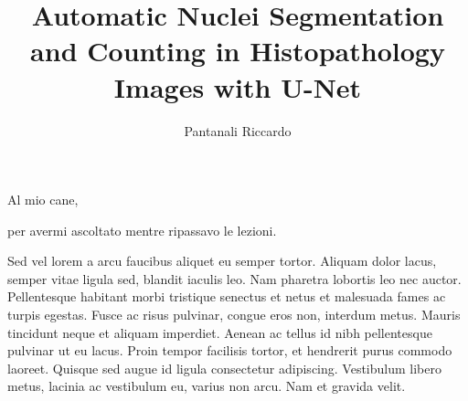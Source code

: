 \documentclass[target=bach,aauheader=,style=]{thud}
\title{Automatic Nuclei Segmentation and Counting in Histopathology Images with U-Net}
\author{Pantanali Riccardo}
\begin{document}
\maketitle

\begin{dedication}
	Al mio cane,\par per avermi ascoltato mentre ripassavo le lezioni.
\end{dedication}

\acknowledgements
Sed vel lorem a arcu faucibus aliquet eu semper tortor. Aliquam dolor lacus, semper vitae ligula sed, blandit iaculis leo. Nam pharetra lobortis leo nec auctor. Pellentesque habitant morbi tristique senectus et netus et malesuada fames ac turpis egestas. Fusce ac risus pulvinar, congue eros non, interdum metus. Mauris tincidunt neque et aliquam imperdiet. Aenean ac tellus id nibh pellentesque pulvinar ut eu lacus. Proin tempor facilisis tortor, et hendrerit purus commodo laoreet. Quisque sed augue id ligula consectetur adipiscing. Vestibulum libero metus, lacinia ac vestibulum eu, varius non arcu. Nam et gravida velit.


\tableofcontents


\listoffigures

\mainmatter


\end{document}
